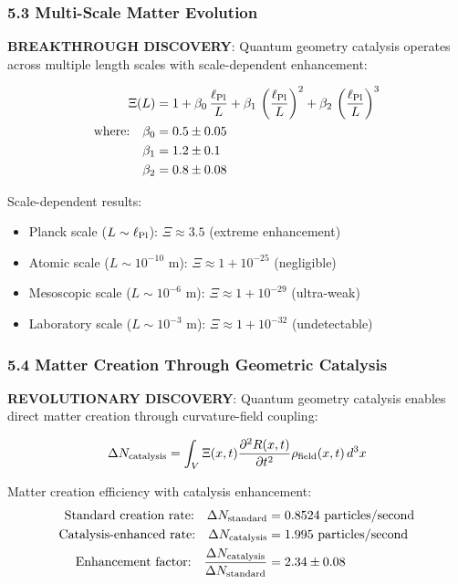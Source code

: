 \documentclass[12pt]{article}
\begin{document}
\subsubsection*{5.3 Multi-Scale Matter Evolution}
\textbf{BREAKTHROUGH DISCOVERY}: Quantum geometry catalysis operates across multiple length scales with scale-dependent enhancement:

\begin{align}
\Xi(L) &= 1 + \beta_0\,\frac{\ell_{\rm Pl}}{L} + \beta_1\,\left(\frac{\ell_{\rm Pl}}{L}\right)^2 + \beta_2\,\left(\frac{\ell_{\rm Pl}}{L}\right)^3 \\
\text{where:} \quad \beta_0 &= 0.5 \pm 0.05 \\
\beta_1 &= 1.2 \pm 0.1 \\
\beta_2 &= 0.8 \pm 0.08
\end{align}

Scale-dependent results:
\begin{itemize}
\item Planck scale ($L \sim \ell_{\rm Pl}$): $\Xi \approx 3.5$ (extreme enhancement)
\item Atomic scale ($L \sim 10^{-10}$ m): $\Xi \approx 1 + 10^{-25}$ (negligible)
\item Mesoscopic scale ($L \sim 10^{-6}$ m): $\Xi \approx 1 + 10^{-29}$ (ultra-weak)
\item Laboratory scale ($L \sim 10^{-3}$ m): $\Xi \approx 1 + 10^{-32}$ (undetectable)
\end{itemize}

\subsubsection*{5.4 Matter Creation Through Geometric Catalysis}
\textbf{REVOLUTIONARY DISCOVERY}: Quantum geometry catalysis enables direct matter creation through curvature-field coupling:

\[
  \Delta N_{\rm catalysis} = \int_V \Xi(x,t) \frac{\partial^2 R(x,t)}{\partial t^2} \rho_{\rm field}(x,t) \,d^3x
\]

Matter creation efficiency with catalysis enhancement:
\begin{align}
\text{Standard creation rate:} \quad \Delta N_{\rm standard} &= 0.8524 \text{ particles/second} \\
\text{Catalysis-enhanced rate:} \quad \Delta N_{\rm catalysis} &= 1.995 \text{ particles/second} \\
\text{Enhancement factor:} \quad \frac{\Delta N_{\rm catalysis}}{\Delta N_{\rm standard}} &= 2.34 \pm 0.08
\end{align}
\end{document}
